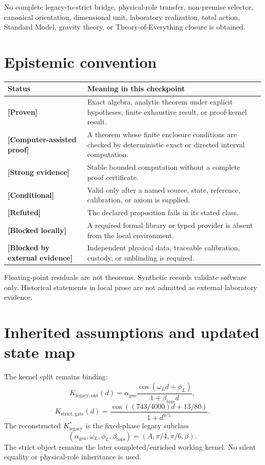 \documentclass[11pt,a4paper]{article}
\newcommand{\status}[1]{\textbf{[#1]}}
\newcommand{\Klegacy}{K_{\mathrm{legacy,ont}}}
\newcommand{\Kstrict}{K_{\mathrm{strict,gate}}}
\newcommand{\Kstar}{K^*_{\mathrm{legacy}}}
\begin{document}
No complete legacy-to-strict bridge, physical-role transfer, non-premise
selector, canonical orientation, dimensional unit, laboratory realization,
total action, Standard Model, gravity theory, or Theory-of-Everything closure
is obtained.

\section{Epistemic convention}

\begin{longtable}{p{}p{}}
\toprule
Status & Meaning in this checkpoint\\\midrule
\status{Proven} & Exact algebra, analytic theorem under explicit hypotheses,
finite exhaustive result, or proof-kernel result.\\
\status{Computer-assisted proof} & A theorem whose finite enclosure conditions
are checked by deterministic exact or directed interval computation.\\
\status{Strong evidence} & Stable bounded computation without a complete proof
certificate.\\
\status{Conditional} & Valid only after a named source, state, reference,
calibration, or axiom is supplied.\\
\status{Refuted} & The declared proposition fails in its stated class.\\
\status{Blocked locally} & A required formal library or typed provider is absent
from the local environment.\\
\status{Blocked by external evidence} & Independent physical data, traceable
calibration, custody, or unblinding is required.\\
\bottomrule
\end{longtable}

Floating-point residuals are not theorems. Synthetic records validate software
only. Historical statements in local prose are not admitted as external
laboratory evidence.

\section{Inherited assumptions and updated state map}

The kernel split remains binding:
\[
\Klegacy(d)=\alpha_{\mathrm{geo}}
\frac{\cos(\omega_Ld+\phi_L)}{1+\beta_{\mathrm{tors}}d},
\]
\[
\Kstrict(d)=\frac{\cos((743/4000)d+13/80)}{1+d^{9/5}}.
\]
The reconstructed $\Kstar$ is the fixed-phase legacy subclass
\[
(\alpha_{\mathrm{geo}},\omega_L,\phi_L,\beta_{\mathrm{tors}})
=(A,\pi/4,\pi/6,\beta).
\]
The strict object remains the later completed/enriched working kernel. No
silent equality or physical-role inheritance is used.
\end{document}

